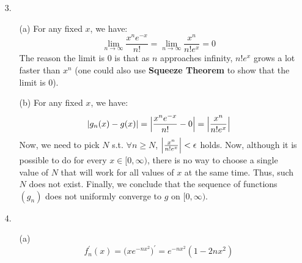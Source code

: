 \documentclass[11pt]{article}
\DeclarePairedDelimiter\abs{\lvert}{\rvert}%
\DeclarePairedDelimiter\absb{\Big\lvert}{\Big\rvert}%
\begin{document}
\begin{itemize}
    \item[3.]
        \begin{itemize}
            \item[(a)]
                For any fixed $x$, we have:
                \begin{equation*}
                    \lim_{n \to \infty} \frac{x^ne^{-x}}{n!}
                        = \lim_{n \to \infty} \frac{x^n}{n!e^x}
                        = 0
                \end{equation*}
                The reason the limit is $0$ is that as $n$ approaches infinity,
                $n!e^x$ grows a lot faster than $x^n$ (one could also use
                \textbf{Squeeze Theorem} to show that the limit is $0$).

            \item[(b)]
                For any fixed $x$, we have:
                \begin{equation*}
                    \abs{g_n(x) - g(x)}
                        = \absb{\frac{x^ne^{-x}}{n!} - 0}
                        = \absb{\frac{x^n}{n!e^x}}
                \end{equation*}
                Now, we need to pick $N$ s.t. $\forall n \geq N$,
                $\absb{\frac{x^n}{n!e^x}} < \epsilon$ holds. Now, although it
                is possible to do for every $x \in [0, \infty)$, there is no
                way to choose a single value of $N$ that will work for all
                values of $x$ at the same time. Thus, such $N$ does not exist.
                Finally, we conclude that the sequence of functions $(g_n)$
                does not uniformly converge to $g$ on $[0, \infty)$.
        \end{itemize}

    \item[4.]
        \begin{itemize}
            \item[(a)]
                \begin{equation*}
                    f^\prime_n(x)
                        = \Big(xe^{-nx^2}\Big)^\prime
                        = e^{-nx^2}(1 - 2nx^2)
                \end{equation*}


\end{itemize}
\end{itemize}
\end{document}
